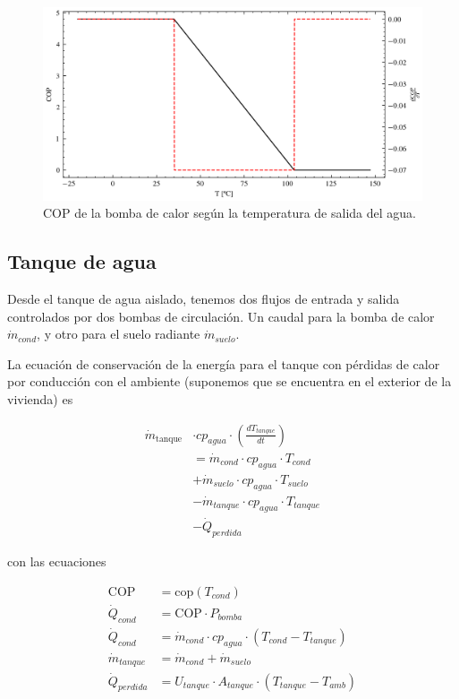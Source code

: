 \begin{figure}[h] \centering
	\centering
	\includegraphics[width=1\textwidth]{./capitulos/resultados_discusion/images/heat_pump_cop.png}
	\caption{COP de la bomba de calor según la temperatura de salida del agua.}
	\label{fig:heat_pump_cop}
\end{figure}


\subsection{Tanque de agua}

Desde el tanque de agua aislado, tenemos dos flujos de entrada y salida
controlados por dos bombas de circulación. Un caudal para la bomba de calor
$\dot{m}_{cond}$, y otro para el suelo radiante $\dot{m}_{suelo}$.

La ecuación de conservación de la energía para el tanque con pérdidas de calor
por conducción con el ambiente (suponemos que se encuentra en el exterior de la
vivienda) es

\begin{align}
	\dot{m}_{\text{tanque}} & \cdot cp_{agua} \cdot \left( \frac{dT_{tanque}}{dt} \right) \nonumber \\
	                        & = \dot{m}_{cond} \cdot cp_{agua} \cdot T_{cond}  \nonumber            \\
	                        & + \dot{m}_{suelo} \cdot cp_{agua} \cdot T_{suelo} \nonumber           \\
	                        & - \dot{m}_{tanque} \cdot cp_{agua} \cdot T_{tanque} \nonumber         \\
	                        & - \dot{Q}_{perdida}
\end{align}

con las ecuaciones

\begin{align}
	\text{COP}        & = \text{cop}(T_{cond})                                         \\
	\dot{Q}_{cond}    & = \text{COP} \cdot P_{bomba}                                   \\
	\dot{Q}_{cond}    & = \dot{m}_{cond} \cdot cp_{agua} \cdot (T_{cond} - T_{tanque}) \\
	\dot{m}_{tanque}  & = \dot{m}_{cond} + \dot{m}_{suelo}                             \\
	\dot{Q}_{perdida} & = U_{tanque} \cdot A_{tanque} \cdot (T_{tanque} - T_{amb})
\end{align}

